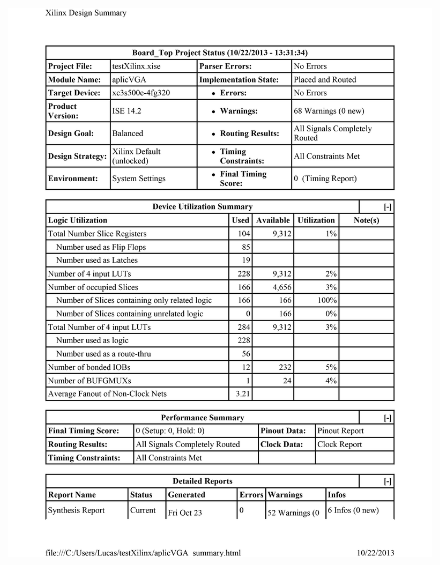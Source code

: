 \documentclass{article}
\begin{document}
\begin{figure}[h!]
  \centering
	\includegraphics[scale=0.7]{aplicVGA_summary-1.png}\\[1cm] 
\end{figure}
\end{document}
